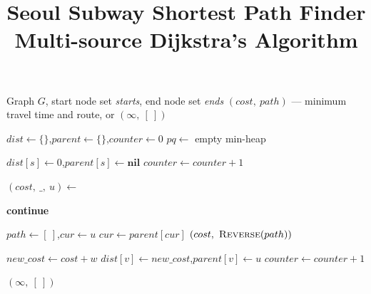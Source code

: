 \documentclass{article}
\title{Seoul Subway Shortest Path Finder\\
\large Multi-source Dijkstra's Algorithm}
\author{}
\date{}
\begin{document}
\maketitle

\begin{algorithm}
\caption{Multi-source Dijkstra($G$, \textit{starts}, \textit{ends})}
\begin{algorithmic}[1]

\Require Graph $G$, start node set \textit{starts}, end node set \textit{ends}
\Ensure $(cost,\ path)$ — minimum travel time and route, or $(\infty,\ [\ ])$

\State $dist \gets \{\}$,\quad $parent \gets \{\}$,\quad $counter \gets 0$
\State $pq \gets$ empty min-heap

    \State $dist[s] \gets 0$,\quad $parent[s] \gets \textbf{nil}$
    \State {}
    \State $counter \gets counter + 1$
\EndFor

    \State $(cost,\ \_,\ u) \gets$ 

        \State \textbf{continue} 
    \EndIf

     
        \State $path \gets [\ ]$,\quad $cur \gets u$
            \State {}
            \State $cur \gets parent[cur]$
        \EndWhile
        \State \Return $(cost,\ \Call{Reverse}{path})$
    \EndIf

        \State $new\_cost \gets cost + w$
            \State $dist[v] \gets new\_cost$,\quad $parent[v] \gets u$
            \State {}
            \State $counter \gets counter + 1$
        \EndIf
    \EndFor
\EndWhile

\State \Return $(\infty,\ [\ ])$

\end{algorithmic}
\end{algorithm}
\end{document}
